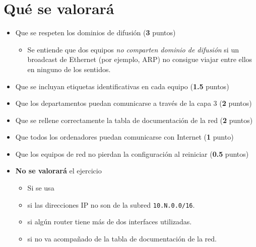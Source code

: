 \section{Qué se valorará}
\begin{itemize}
\item Que se respeten los dominios de difusión (\textbf{3} puntos)
  \begin{itemize}
  \item Se entiende que dos equipos \textit{no comparten dominio de difusión} si un broadcast de Ethernet (por ejemplo, ARP) no consigue viajar entre ellos en ninguno de los sentidos.
  \end{itemize}
\item Que se incluyan etiquetas identificativas en cada equipo (\textbf{1.5} puntos)  
\item Que los departamentos puedan comunicarse a través de la capa 3 (\textbf{2} puntos)
\item Que se rellene correctamente la tabla de documentación de la red (\textbf{2} puntos)
\item Que todos los ordenadores puedan comunicarse con Internet (\textbf{1} punto)
\item Que los equipos de red no pierdan la configuración al reiniciar (\textbf{0.5} puntos)
\item \textbf{No se valorará} el ejercicio
  \begin{itemize}
  \item Si se usa \texttt{}
  \item si las direcciones IP no son de la subred \texttt{10.N.0.0/16}.
  \item si algún router tiene más de dos interfaces utilizadas.
  \item si no va acompañado de la tabla de documentación de la red.
  \end{itemize}
\end{itemize}




